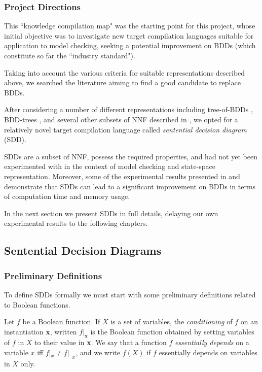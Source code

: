 \documentclass[12]{article}
\newenvironment{definition}[1][Definition]{\begin{trivlist}
\item[\hskip \labelsep {\bfseries #1}]}{\end{trivlist}}
\begin{document}
 
 
\subsubsection{Project Directions}

 This ``knowledge compilation map" was the starting point for this project, whose initial objective was to investigate new target compilation languages suitable for application to model checking, seeking a potential improvement on BDDs (which constitute so far the ``industry standard").

 Taking into account the various criteria for suitable representations described above, we searched the literature aiming to find a good candidate to replace BDDs. 

After considering a number of different representations including tree-of-BDDs \cite{trees_of_bdds}, BDD-trees \cite{bdd_trees}, and several other subsets of NNF described in \cite{compilation_map}, we opted for a relatively novel target compilation language called \textit{sentential decision diagram} (SDD). 

SDDs are a subset of NNF, possess the required properties, and had not yet been experimented with in the context of model checking and state-space representation. 
Moreover, some of the experimental results presented in \cite{sdd_1} and \cite{sdd_3} demonstrate that SDDs can lead to a significant improvement on BDDs in terms of computation time and memory usage. 

In the next section we present SDDs in full details, delaying our own experimental results to the following chapters.


\subsection{Sentential Decision Diagrams}

\subsubsection{Preliminary Definitions}

To define SDDs formally we must start with some preliminary definitions related to Boolean functions. 

\begin{definition} 
Let $f$ be a Boolean function. If $X$ is a set of variables, the \textit{conditioning} of $f$ on an instantiation \textbf{x}, written $f|_{\textbf{x}}$ is the Boolean function obtained by setting variables of $f$ in $X$ to their value in \textbf{x}. 
We say that a function $f$ \textit{essentially depends} on a variable $x$ iff $f|_{x} \neq f|_{\lnot x}$, and we write $f(X)$ if $f$ essentially depends on variables in $X$ only.
\end{definition}
\end{document}
